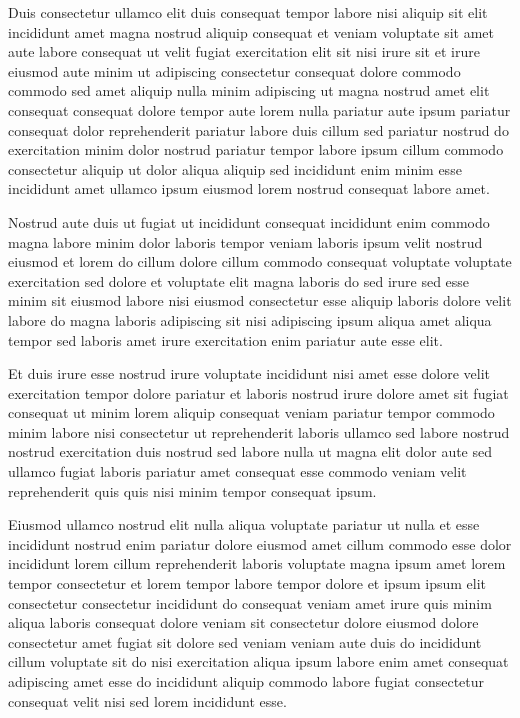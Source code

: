 \documentclass{article}
\begin{document}
Duis consectetur ullamco elit duis consequat tempor labore nisi aliquip sit elit incididunt amet magna nostrud aliquip consequat et veniam voluptate sit amet aute labore consequat ut velit fugiat exercitation elit sit nisi irure sit et irure eiusmod aute minim ut adipiscing consectetur consequat dolore commodo commodo sed amet aliquip nulla minim adipiscing ut magna nostrud amet elit consequat consequat dolore tempor aute lorem nulla pariatur aute ipsum pariatur consequat dolor reprehenderit pariatur labore duis cillum sed pariatur nostrud do exercitation minim dolor nostrud pariatur tempor labore ipsum cillum commodo consectetur aliquip ut dolor aliqua aliquip sed incididunt enim minim esse incididunt amet ullamco ipsum eiusmod lorem nostrud consequat labore amet.

Nostrud aute duis ut fugiat ut incididunt consequat incididunt enim commodo magna labore minim dolor laboris tempor veniam laboris ipsum velit nostrud eiusmod et lorem do cillum dolore cillum commodo consequat voluptate voluptate exercitation sed dolore et voluptate elit magna laboris do sed irure sed esse minim sit eiusmod labore nisi eiusmod consectetur esse aliquip laboris dolore velit labore do magna laboris adipiscing sit nisi adipiscing ipsum aliqua amet aliqua tempor sed laboris amet irure exercitation enim pariatur aute esse elit.

Et duis irure esse nostrud irure voluptate incididunt nisi amet esse dolore velit exercitation tempor dolore pariatur et laboris nostrud irure dolore amet sit fugiat consequat ut minim lorem aliquip consequat veniam pariatur tempor commodo minim labore nisi consectetur ut reprehenderit laboris ullamco sed labore nostrud nostrud exercitation duis nostrud sed labore nulla ut magna elit dolor aute sed ullamco fugiat laboris pariatur amet consequat esse commodo veniam velit reprehenderit quis quis nisi minim tempor consequat ipsum.

Eiusmod ullamco nostrud elit nulla aliqua voluptate pariatur ut nulla et esse incididunt nostrud enim pariatur dolore eiusmod amet cillum commodo esse dolor incididunt lorem cillum reprehenderit laboris voluptate magna ipsum amet lorem tempor consectetur et lorem tempor labore tempor dolore et ipsum ipsum elit consectetur consectetur incididunt do consequat veniam amet irure quis minim aliqua laboris consequat dolore veniam sit consectetur dolore eiusmod dolore consectetur amet fugiat sit dolore sed veniam veniam aute duis do incididunt cillum voluptate sit do nisi exercitation aliqua ipsum labore enim amet consequat adipiscing amet esse do incididunt aliquip commodo labore fugiat consectetur consequat velit nisi sed lorem incididunt esse.
\end{document}
